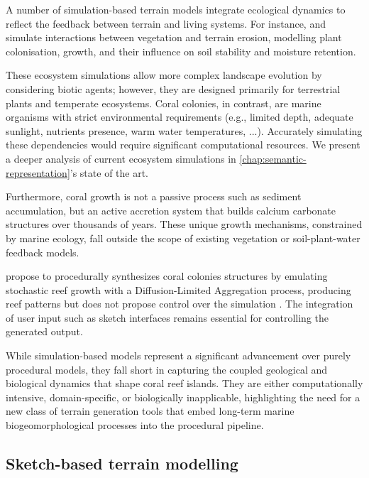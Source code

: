 
A number of simulation-based terrain models integrate ecological dynamics to reflect the feedback between terrain and living systems. For instance, \cite{Ecormier-Nocca2021} and \cite{Cordonnier2017b} simulate interactions between vegetation and terrain erosion, modelling plant colonisation, growth, and their influence on soil stability and moisture retention.

These ecosystem simulations allow more complex landscape evolution by considering biotic agents; however, they are designed primarily for terrestrial plants and temperate ecosystems. Coral colonies, in contrast, are marine organisms with strict environmental requirements (e.g., limited depth, adequate sunlight, nutrients presence, warm water temperatures, ...). Accurately simulating these dependencies would require significant computational resources. We present a deeper analysis of current ecosystem simulations in \cref{chap:semantic-representation}'s state of the art.

Furthermore, coral growth is not a passive process such as sediment accumulation, but an active accretion system that builds calcium carbonate structures over thousands of years. These unique growth mechanisms, constrained by marine ecology, fall outside the scope of existing vegetation or soil-plant-water feedback models.

 propose to procedurally synthesizes coral colonies structures by emulating stochastic reef growth with a Diffusion-Limited Aggregation process, producing reef patterns but does not propose control over the simulation \cite{Li2021}. The integration of user input such as sketch interfaces remains essential for controlling the generated output.

\midConclusion

While simulation-based models represent a significant advancement over purely procedural models, they fall short in capturing the coupled geological and biological dynamics that shape coral reef islands. They are either computationally intensive, domain-specific, or biologically inapplicable, highlighting the need for a new class of terrain generation tools that embed long-term marine biogeomorphological processes into the procedural pipeline.


\subsection{Sketch-based terrain modelling}
\label{sec:coral-island-sota-sketches}

